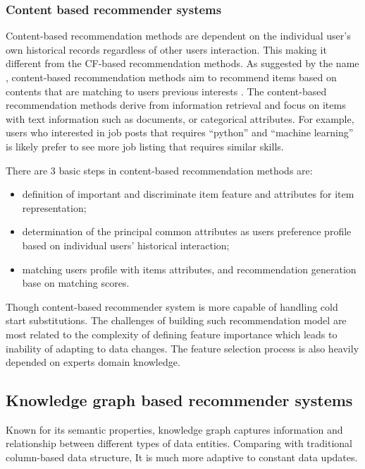 \bigskip
\subsubsection{Content based recommender systems}

Content-based recommendation methods are dependent on the individual user’s own historical records regardless of other users interaction. This making it different from the CF-based recommendation methods. 
As suggested by the name , content-based recommendation methods aim to recommend items based on contents that are matching to users previous interests \citep{shardanand1995social}. The content-based recommendation methods derive from information retrieval and focus on items with text information such as documents, or categorical attributes. For example, users who interested in job posts that requires ``python'' and ``machine learning'' is likely prefer to see more job listing that requires similar skills. 

There are 3 basic steps in content-based recommendation methods are: 
\begin{itemize}
    \item definition of important and discriminate item feature and attributes for item representation;
    \item determination of the principal common attributes as users preference profile based on individual users' historical interaction;
    \item matching users profile with items attributes, and recommendation generation base on matching scores.
\end{itemize}

Though content-based recommender system is more capable of handling cold start substitutions. The challenges of building such recommendation model are most related to the complexity of defining feature importance which leads to inability of adapting to data changes. The feature selection process is also heavily depended on experts domain knowledge. 

\subsection{Knowledge graph based recommender systems}
Known for its semantic properties, knowledge graph captures information and relationship between different types of data entities. Comparing with traditional column-based data structure, It is much more adaptive to constant data updates. 

